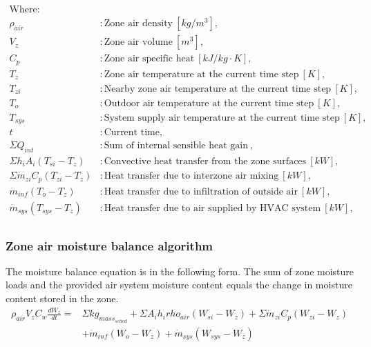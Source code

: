 \begin{align*}
\text{Where: }\\
  \rho_{air} &: \text{Zone air density} ~ [kg/m^{3}], \\
  V_{z} &: \text{Zone air volume} ~ [m^{3}],\\
  C_{p} &: \text{Zone air specific heat} ~ [kJ/kg \cdot K],\\
  T_{z} &: \text{Zone air temperature at the current time step} ~[K],\\
  T_{zi} &: \text{Nearby zone air temperature at the current time step} ~[K],\\
  T_{o} &: \text{Outdoor air temperature at the current time step} ~[K],\\
  T_{sys} &: \text{System supply air temperature at the current time step} ~[K],\\
  t &: \text{Current time},\\
  \Sigma{Q_{int}} &: \text{Sum of internal sensible heat gain} ~ ,\\
  \Sigma{h_i A_i (T_{si}-T_z)} &: \text{Convective heat transfer from the zone surfaces} ~ [kW],\\
  \Sigma{\dot{m}_{zi}C_p(T_{zi}-T_z)} &: \text{Heat transfer due to interzone air mixing} ~ [kW],\\
  \dot{m}_{inf} (T_o - T_z)&: \text{Heat transfer due to infiltration of outside air} ~ [kW],\\
  \dot{m}_{sys} (T_{sys} - T_z)&: \text{Heat transfer due to air supplied by HVAC system} ~ [kW],\\
\end{align*}


\subsubsection{Zone air moisture balance algorithm}\label{Zone-air-moisture-balance-algorithm}
The moisture balance equation is in the following form. The sum of zone moisture loads and the provided air system moisture content equals the change in moisture content stored in the zone.
\begin{equation}
\begin{aligned}
\rho_{air} V_{z} C_{w}\frac {dW_z} {dt} = &\Sigma{kg_{mass_{sched}}} + \Sigma{A_i h_i rho_{air} (W_{si} - W_z)} + \Sigma{\dot{m}_{zi} C_p (W_{zi}-W_z)} \\
& + \dot{m}_{inf} (W_o - W_z) + \dot{m}_{sys} (W_{sys} - W_z)
\end{aligned}
\end{equation}

